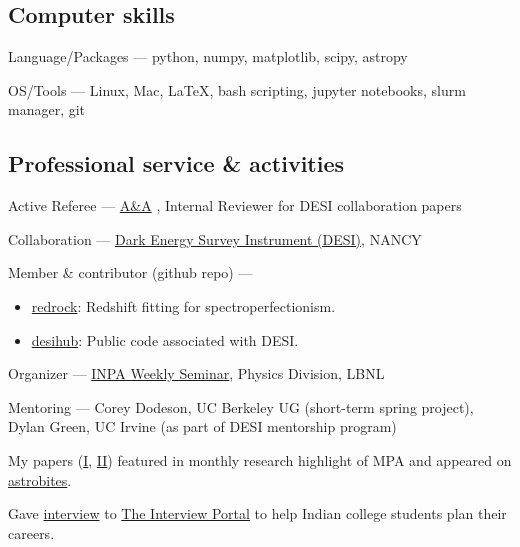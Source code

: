 \documentclass[12pt,letterpaper]{article}
\begin{document}
\subsection{Computer skills}
\begin{list}{}{\cvlist}
\item Language/Packages ---  
    python, numpy, matplotlib, scipy, astropy
\item OS/Tools --- Linux, Mac, \LaTeX, bash scripting, jupyter notebooks, slurm manager, git
\end{list}

\subsection{Professional service \& activities}
\begin{list}{}{\cvlist}
    \item Active Referee ---
    \href{https://en.wikipedia.org/wiki/Astronomy_%26_Astrophysics}{A\&A}
    , Internal Reviewer for DESI collaboration papers
    \item Collaboration ---
        \href{https://www.desi.lbl.gov/}{Dark Energy Survey Instrument (DESI)}, NANCY
    \item Member \& contributor (github repo) ---
    \begin{itemize}
      \item[] \href{https://github.com/desihub/redrock}{redrock}: Redshift fitting for spectroperfectionism.
      \item[] \href{https://github.com/desihub}{desihub}: Public code associated with DESI.
    \end{itemize}
    \item Organizer ---
        \href{https://inpa.lbl.gov/events/}{INPA Weekly Seminar}, Physics Division, LBNL
    \item Mentoring ---
        Corey Dodeson, UC Berkeley UG (short-term spring project), Dylan Green, UC Irvine (as part of DESI mentorship program)
    \item My papers (\href{https://www.mpa-garching.mpg.de/964620/hl202107}{I}, \href{https://www.mpa-garching.mpg.de/1066558/hl202211?c=27981}{II}) featured in monthly research highlight of MPA and appeared on \href{https://astrobites.org/2021/05/06/cool-metal-gas-search-thanks-it-was-automated/}{astrobites}.
    \item Gave \href{https://theinterviewportal.com/2020/03/13/astrophysicist-interview-8/}{interview} to \href{https://theinterviewportal.com/}{The Interview Portal} to help Indian college students plan their careers. 

\end{list}
\end{document}
